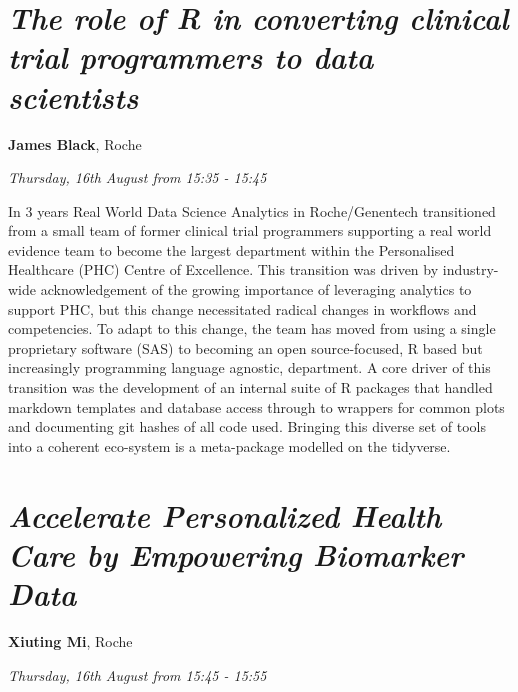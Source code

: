 \documentclass[]{book}
\theoremstyle{definition}
\theoremstyle{definition}
\theoremstyle{definition}
\theoremstyle{remark}
\begin{document}
\hypertarget{the-role-of-r-in-converting-clinical-trial-programmers-to-data-scientists-1}{%
\section{\texorpdfstring{\emph{The role of R in converting clinical
trial programmers to data
scientists}}{The role of R in converting clinical trial programmers to data scientists}}\label{the-role-of-r-in-converting-clinical-trial-programmers-to-data-scientists-1}}

\textbf{James Black}, Roche

\emph{Thursday, 16th August from 15:35 - 15:45}

In 3 years Real World Data Science Analytics in Roche/Genentech
transitioned from a small team of former clinical trial programmers
supporting a real world evidence team to become the largest department
within the Personalised Healthcare (PHC) Centre of Excellence. This
transition was driven by industry-wide acknowledgement of the growing
importance of leveraging analytics to support PHC, but this change
necessitated radical changes in workflows and competencies. To adapt to
this change, the team has moved from using a single proprietary software
(SAS) to becoming an open source-focused, R based but increasingly
programming language agnostic, department. A core driver of this
transition was the development of an internal suite of R packages that
handled markdown templates and database access through to wrappers for
common plots and documenting git hashes of all code used. Bringing this
diverse set of tools into a coherent eco-system is a meta-package
modelled on the tidyverse.

\hypertarget{accelerate-personalized-health-care-by-empowering-biomarker-data-1}{%
\section{\texorpdfstring{\emph{Accelerate Personalized Health Care by
Empowering Biomarker
Data}}{Accelerate Personalized Health Care by Empowering Biomarker Data}}\label{accelerate-personalized-health-care-by-empowering-biomarker-data-1}}

\textbf{Xiuting Mi}, Roche

\emph{Thursday, 16th August from 15:45 - 15:55}
\end{document}

